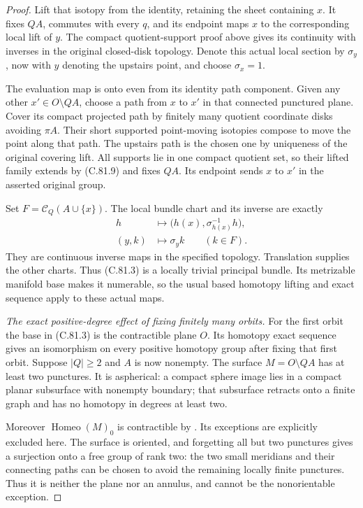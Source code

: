 \begin{proof}
Lift that isotopy from the identity, retaining
the sheet containing $x$. It fixes $QA$,
commutes with every $q$, and its endpoint
maps $x$ to the corresponding local lift
of $y$. The compact quotient-support proof
above gives its continuity with inverses
in the original closed-disk topology.
Denote this actual local section by $\sigma_y$,
now with $y$ denoting the upstairs point,
and choose $\sigma_x=1$.

The evaluation map is onto even from its
identity path component. Given any other
$x'\in O\setminus QA$, choose a path from
$x$ to $x'$ in that connected punctured plane.
Cover its compact projected path by finitely
many quotient coordinate disks avoiding $\pi A$.
Their short supported point-moving isotopies
compose to move the point along that path.
The upstairs path is the chosen one by
uniqueness of the original covering lift.
All supports lie in one compact quotient
set, so their lifted family extends by
(C.81.9) and fixes $QA$. Its endpoint sends
$x$ to $x'$ in the asserted original group.

Set $F=\mathscr C_Q(A\cup\{x\})$. The local
bundle chart and its inverse are exactly
\[
 \begin{split}
 h&\longmapsto\bigl(h(x),\sigma_{h(x)}^{-1}h\bigr),\\
 (y,k)&\longmapsto\sigma_y k\qquad(k\in F).
 \end{split}                                                   \tag{C.81.11}
\]
They are continuous inverse maps in the
specified topology. Translation supplies
the other charts. Thus (C.81.3) is a locally
trivial principal bundle. Its metrizable
manifold base makes it numerable, so the
usual based homotopy lifting and exact
sequence apply to these actual maps.

\emph{The exact positive-degree effect of fixing finitely many orbits.}
For the first orbit the base in (C.81.3)
is the contractible plane $O$. Its homotopy
exact sequence gives an isomorphism on
every positive homotopy group after fixing
that first orbit. Suppose $|Q|\geq2$ and
$A$ is now nonempty. The surface
$M=O\setminus QA$ has at least two punctures.
It is aspherical: a compact sphere image
lies in a compact planar subsurface with
nonempty boundary; that subsurface retracts
onto a finite graph and has no homotopy
in degrees at least two.

Moreover $\operatorname{Homeo}(M)_0$ is
contractible by \cite[Theorem~1.1]{C_Yagasaki2000}.
Its exceptions are explicitly excluded here.
The surface is oriented, and forgetting all
but two punctures gives a surjection onto
a free group of rank two: the two small
meridians and their connecting paths can
be chosen to avoid the remaining locally
finite punctures. Thus it is neither the
plane nor an annulus, and cannot be the
nonorientable exception.


\end{proof}
